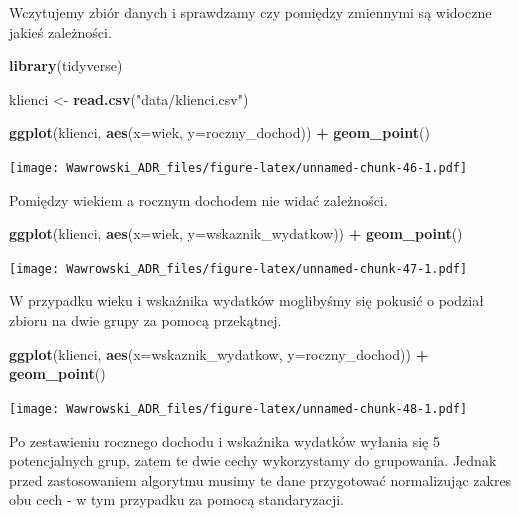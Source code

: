 \documentclass[]{book}
\newenvironment{Shaded}{\begin{snugshade}}{\end{snugshade}}
\newcommand{\DataTypeTok}[1]{\textcolor[rgb]{0.13,0.29,0.53}{#1}}
\newcommand{\KeywordTok}[1]{\textcolor[rgb]{0.13,0.29,0.53}{\textbf{#1}}}
\newcommand{\NormalTok}[1]{#1}
\newcommand{\OperatorTok}[1]{\textcolor[rgb]{0.81,0.36,0.00}{\textbf{#1}}}
\newcommand{\StringTok}[1]{\textcolor[rgb]{0.31,0.60,0.02}{#1}}
\begin{document}
Wczytujemy zbiór danych i sprawdzamy czy pomiędzy zmiennymi są widoczne jakieś zależności.

\begin{Shaded}
\begin{Highlighting}[]
\KeywordTok{library}\NormalTok{(tidyverse)}

\NormalTok{klienci <-}\StringTok{ }\KeywordTok{read.csv}\NormalTok{(}\StringTok{"data/klienci.csv"}\NormalTok{)}

\KeywordTok{ggplot}\NormalTok{(klienci, }\KeywordTok{aes}\NormalTok{(}\DataTypeTok{x=}\NormalTok{wiek, }\DataTypeTok{y=}\NormalTok{roczny_dochod)) }\OperatorTok{+}
\StringTok{  }\KeywordTok{geom_point}\NormalTok{()}
\end{Highlighting}
\end{Shaded}

\texttt{[image: Wawrowski\_ADR\_files/figure-latex/unnamed-chunk-46-1.pdf]}

Pomiędzy wiekiem a rocznym dochodem nie widać zależności.

\begin{Shaded}
\begin{Highlighting}[]
\KeywordTok{ggplot}\NormalTok{(klienci, }\KeywordTok{aes}\NormalTok{(}\DataTypeTok{x=}\NormalTok{wiek, }\DataTypeTok{y=}\NormalTok{wskaznik_wydatkow)) }\OperatorTok{+}
\StringTok{  }\KeywordTok{geom_point}\NormalTok{()}
\end{Highlighting}
\end{Shaded}

\texttt{[image: Wawrowski\_ADR\_files/figure-latex/unnamed-chunk-47-1.pdf]}

W przypadku wieku i wskaźnika wydatków moglibyśmy się pokusić o podział zbioru na dwie grupy za pomocą przekątnej.

\begin{Shaded}
\begin{Highlighting}[]
\KeywordTok{ggplot}\NormalTok{(klienci, }\KeywordTok{aes}\NormalTok{(}\DataTypeTok{x=}\NormalTok{wskaznik_wydatkow, }\DataTypeTok{y=}\NormalTok{roczny_dochod)) }\OperatorTok{+}
\StringTok{  }\KeywordTok{geom_point}\NormalTok{()}
\end{Highlighting}
\end{Shaded}

\texttt{[image: Wawrowski\_ADR\_files/figure-latex/unnamed-chunk-48-1.pdf]}

Po zestawieniu rocznego dochodu i wskaźnika wydatków wyłania się 5 potencjalnych grup, zatem te dwie cechy wykorzystamy do grupowania. Jednak przed zastosowaniem algorytmu musimy te dane przygotować normalizując zakres obu cech - w tym przypadku za pomocą standaryzacji.
\end{document}
